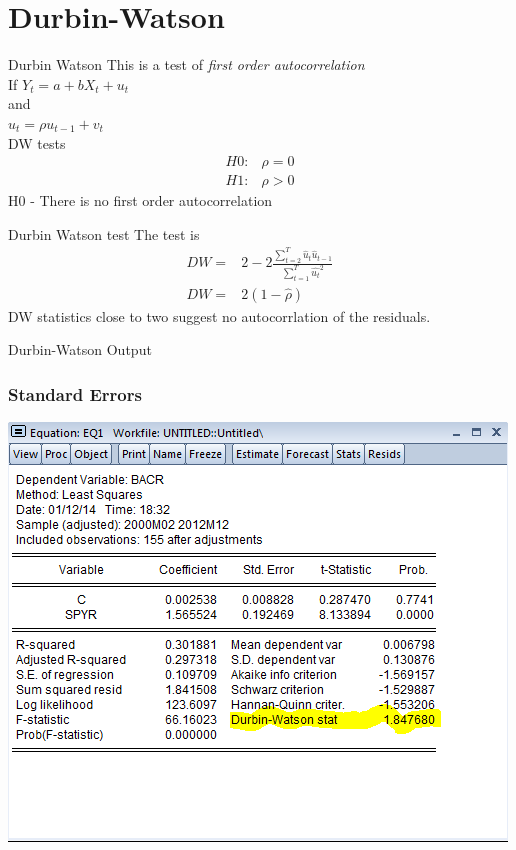 \documentclass[14pt,xcolor=pdftex,dvipsnames,table]{beamer}\usepackage[]{graphicx}\usepackage[]{color}
\begin{document}
\section{Durbin-Watson}
\begin{frame}{Durbin Watson}
This is a test of \emph{first order autocorrelation}\\
If 
$Y_t = a + b X_t + u_t$\\
and \\
$u_t = \rho u_{t-1} + v_t$\\
DW tests 
\begin{align*}
H0:& \rho = 0\\
H1:& \rho > 0
\end{align*}
H0 - There is no first order autocorrelation
\end{frame}

\begin{frame}{Durbin Watson test}
The test is 
\begin{align*}
DW =& 2 - 2 \frac{\sum_{t = 2}^T \hat{u}_t \hat{u}_{t-1}}{\sum_{t=1}^T \hat{u_t}^2}\\
DW =& 2(1 - \hat{\rho})
\end{align*}
DW statistics close to two suggest no autocorrlation of the residuals.
\end{frame}

\begin{frame}{Durbin-Watson Output}
\graphicspath{{./Figures/}}
\frametitle{Standard Errors}
\begin{center}
\includegraphics[height = 3 in]{DW}
\end{center}
\end{frame}
\end{document}
